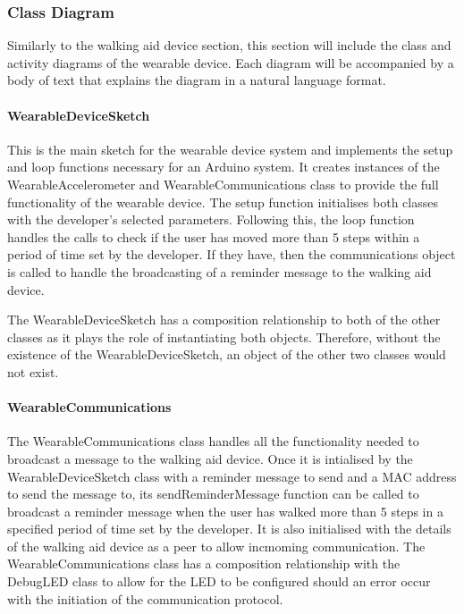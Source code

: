             \subsubsection{Class Diagram}
            \label{subsubsec:class_diagram_wearable}

                Similarly to the walking aid device section, this section will include the class and activity diagrams of the wearable device. Each diagram will be accompanied by a body of text that explains the diagram in a natural language format.

                \clearpage
                \thispagestyle{empty}
                \begin{landscape}
                    
                \end{landscape}

                \paragraph{WearableDeviceSketch}\mbox{}

                    This is the main sketch for the wearable device system and implements the setup and loop functions necessary for an Arduino system. It creates instances of the WearableAccelerometer and WearableCommunications class to provide the full functionality of the wearable device. The setup function initialises both classes with the developer's selected parameters. Following this, the loop function handles the calls to check if the user has moved more than 5 steps within a period of time set by the developer. If they have, then the communications object is called to handle the broadcasting of a reminder message to the walking aid device.

                    The WearableDeviceSketch has a composition relationship to both of the other classes as it plays the role of instantiating both objects. Therefore, without the existence of the WearableDeviceSketch, an object of the other two classes would not exist.

                \paragraph{WearableCommunications}\mbox{}

                    The WearableCommunications class handles all the functionality needed to broadcast a message to the walking aid device. Once it is intialised by the WearableDeviceSketch class with a reminder message to send and a MAC address to send the message to, its sendReminderMessage function can be called to broadcast a reminder message when the user has walked more than 5 steps in a specified period of time set by the developer. It is also initialised with the details of the walking aid device as a peer to allow incmoming communication. The WearableCommunications class has a composition relationship with the DebugLED class to allow for the LED to be configured should an error occur with the initiation of the communication protocol.

